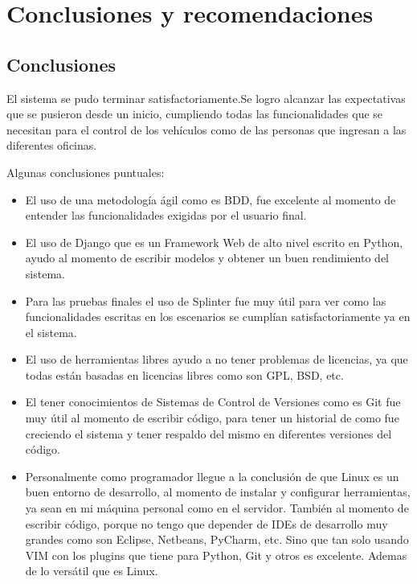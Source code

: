 \begin{savequote}[75mm]
\end{savequote}

\chapter{Conclusiones y recomendaciones}

\section{Conclusiones}
El sistema se pudo terminar satisfactoriamente.Se logro alcanzar las expectativas
que se pusieron desde un inicio, cumpliendo todas las funcionalidades que se
necesitan para el control de los vehículos como de las personas que ingresan a
las diferentes oficinas.

Algunas conclusiones puntuales:

\begin{itemize}
  \item El uso de una metodología ágil como es BDD, fue excelente al
    momento de entender las funcionalidades exigidas por el usuario final.

  \item El uso de Django que es un Framework Web de alto nivel escrito en
    Python, ayudo al momento de escribir modelos y obtener un buen rendimiento
    del sistema.

  \item Para las pruebas finales el uso de Splinter fue muy útil para ver como
    las funcionalidades escritas en los escenarios se cumplían satisfactoriamente
    ya en el sistema.

  \item El uso de herramientas libres ayudo a no tener problemas de licencias,
    ya que todas están basadas en licencias libres como son GPL, BSD, etc.

  \item El tener conocimientos de Sistemas de Control de Versiones como es Git
    fue muy útil al momento de escribir código, para tener un historial
    de como fue creciendo el sistema y tener respaldo del mismo en diferentes
    versiones del código.

  \item Personalmente como programador llegue a la conclusión de que Linux es un
    buen entorno de desarrollo, al momento de instalar y configurar herramientas,
    ya sean en mi máquina personal como en el servidor. También al momento de
    escribir código, porque no tengo que depender de IDEs de desarrollo muy
    grandes como son Eclipse, Netbeans, PyCharm, etc. Sino que tan solo usando
    VIM con los plugins que tiene para Python, Git y otros es excelente. Ademas
    de lo versátil que es Linux.
\end{itemize}


